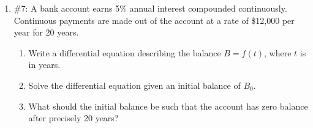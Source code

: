 \documentclass[11pt,letterpaper]{article}
\begin{document}
\begin{enumerate}
{\bf Solution:} First, differentiate using implicit differentiation:
\begin{align*}
\frac{d}{dt}(ma) &= \frac{d}{dt}(mg-kv) \\
m\frac{d}{dt}a &= \frac{d}{dt}(mg)-\frac{d}{dt}(kv) \\
&= 0-k\frac{d}{dt}v \\
m\frac{da}{dt} &= -k\frac{dv}{dt}
\end{align*}
We can replace $\frac{dv}{dt}$ with the expression that was given, so 
\begin{align*}
m\frac{da}{dt} &= -k\left(\frac{mg-kv}{m}\right) \\
\frac{da}{dt} &= \frac{k}{m^2}(kv-mg).
\end{align*} 
We are not done, because we still have $v$ in the expression.  Again, use the given expression $ma=mg-kv$ to get 
\[v=\frac{ma-mg}{-k}=\frac{m}{k}(g-a).\]
Then
\begin{align*}
\frac{da}{dt} &= \frac{k}{m^2}\left(k\left(\frac{m}{k}(g-a)\right)-mg\right) \\
&= \frac{k}{m^2}\left((mg-ma)-mg\right) \\
&= -\frac{k}{m}a.
\end{align*}
The general solution is given by:
\begin{align*}
\frac{da}{dt} &= -\frac{k}{m}a \\
\int\frac{da}{a} &= -\int\frac{k}{m}dt \\
\ln{a} &= -\frac{k}{m}t+\text{Constant} \\
a &= \text{Constant}\cdot e^{-\frac{k}{m}t}
\end{align*}
Apply the initial condition $a(0)=g$
\begin{align*}
g &= \text{Constant}\cdot e^{-\frac{k}{m}\cdot 0} \\
&= \text{Constant}
\end{align*}
to get the solution:
\[a(t)=ge^{-\frac{k}{m}t}\]

\item \#7: A bank account earns 5\% annual interest compounded continuously.  Continuous payments are made out of the account at a rate of \$12,000 per year for 20 years.
\begin{enumerate}
\item Write a differential equation describing the balance $B=f(t)$, where $t$ is in years.
\item Solve the differential equation given an initial balance of $B_0$.
\item What should the initial balance be such that the account has zero balance after precisely 20 years?
\end{enumerate}


\end{enumerate}
\end{document}
